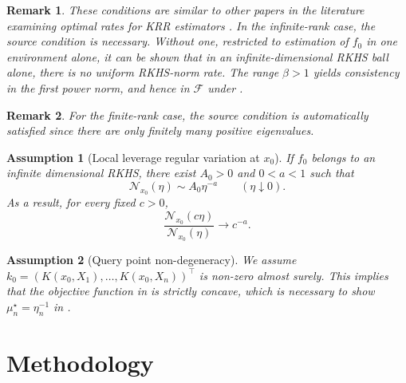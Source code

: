 \documentclass[11pt]{article}
\newtheorem{remark}{Remark}[section]
\newtheorem{assumption}{Assumption}
\newcommand{\F}{\mathcal{F}}
\newcommand{\Ncal}{\mathcal{N}}
\begin{document}
\begin{remark}
These conditions are similar to other papers in the literature examining optimal rates for KRR estimators \cite{blanchard2018optimal,fischer2020sobolev,lin2020optimal}. In the infinite-rank case, the source condition is necessary. Without one, restricted to estimation of $f_0$ in one environment alone, it can be shown that in an infinite-dimensional RKHS ball alone, there is no uniform RKHS-norm rate. The range $\beta>1$ yields consistency in the first power norm, and hence in $\F$ under . 
\end{remark}

\begin{remark}
For the finite-rank case, the source condition is automatically satisfied since there are only finitely many positive eigenvalues.
\end{remark}

\begin{assumption}[Local leverage regular variation at $x_0$]\label{assump:local_leverage}
 If $f_0$ belongs to an infinite dimensional RKHS, there exist $A_0>0$ and $0<a<1$ such that
  \begin{equation}
    \Ncal_{x_0}(\eta)\sim A_0\eta^{-a}\qquad(\eta\downarrow0).
    \label{eq:local_regular_variation}
  \end{equation}
  As a result, for every fixed $c>0$,
  \begin{equation}
    \frac{\Ncal_{x_0}(c\eta)}{\Ncal_{x_0}(\eta)}\to c^{-a}.
    \label{eq:local_ratio}
  \end{equation}

\end{assumption}


\begin{assumption}[Query point non-degeneracy]\label{assump:nondegeneracy}
We assume $k_0=(K(x_0,X_1),\ldots,K(x_0,X_n))^\top$ is non-zero almost surely. This implies that the objective function in  is strictly concave, which is necessary to show $\mu_n^\star=\eta_n^{-1}$ in .
\end{assumption}




\section{Methodology}
\end{document}
